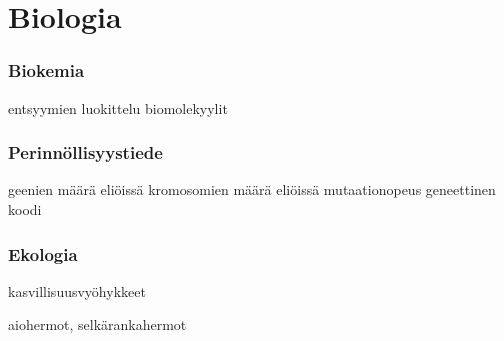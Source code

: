 \part*{Biologia}
\section*{Biokemia}
entsyymien luokittelu
biomolekyylit

\section*{Perinnöllisyystiede}

geenien määrä eliöissä
kromosomien määrä eliöissä
mutaationopeus
geneettinen koodi

\section*{Ekologia}

kasvillisuusvyöhykkeet


aiohermot, selkärankahermot
